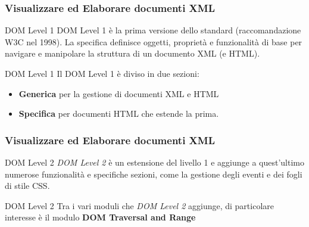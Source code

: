 \begin{frame}
    \frametitle{Visualizzare ed Elaborare documenti XML}
    \addtocounter{nframe}{1}
    

     \begin{block}{DOM Level 1}
       DOM Level 1 è la prima versione dello standard (raccomandazione W3C nel 1998). La specifica definisce  oggetti, proprietà e funzionalità di base per navigare e manipolare la struttura di un documento XML (e HTML).
     \end{block}
     

     \begin{block}{DOM Level 1}
        Il DOM Level 1 è diviso in due sezioni:
        \begin{itemize}
            \item[1] \textbf{Generica} per la gestione di documenti XML e HTML
            \item[2] \textbf{Specifica} per documenti HTML che estende la prima.
        \end{itemize}
      \end{block}

\end{frame}

\begin{frame}
    \frametitle{Visualizzare ed Elaborare documenti XML}
    \addtocounter{nframe}{1}
    

     \begin{block}{DOM Level 2}
       \textit{DOM Level 2} è un estensione del livello 1 e aggiunge a quest'ultimo numerose funzionalità e specifiche sezioni, come la gestione degli eventi e dei fogli di stile CSS.
     \end{block}
     

     \begin{block}{DOM Level 2}
       Tra i vari moduli che \textit{DOM Level 2} aggiunge, di particolare interesse è il modulo \textbf{DOM Traversal and Range}
      \end{block}

\end{frame}

